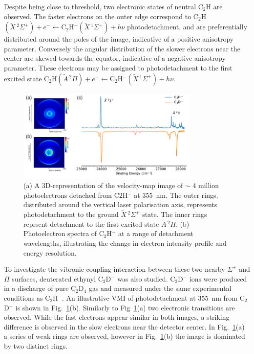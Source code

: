 \documentclass[journal=jpcafh,manuscript=article,layout=onecolumn, 12pt]{achemso}
\begin{document}
Despite being close to threshold, two electronic states of neutral C$_2$H are observed. The faster electrons on the outer edge correspond to C$_2$H$(\tilde{X}\,^2\Sigma^+)+e^- \leftarrow $C$_2$H$^-(\tilde{X}\,^1\Sigma^+)+h\nu$ photodetachment, and are preferentially distributed around the poles of the image, indicative of a positive anisotropy parameter. Conversely the angular distribution of the slower electrons near the center are skewed towards the equator, indicative of a negative anisotropy parameter. These electrons may be assigned to photodetachment to the first excited state C$_2$H$(\tilde{A}\,^2\Pi)+e^- \leftarrow $C$_2$H$^-(\tilde{X}\,^1\Sigma^+)+h\nu$.

\begin{figure}
	\includegraphics[width=0.8\textwidth]{figures/Fig1}
	\caption{(a) A 3D-representation of the velocity-map image of $\sim$ 4 million photoelectrons detached from C$2$H$^-$ at 355~nm. The outer rings, distributed around the vertical laser polarisation axis, represents photodetachment to the ground $\tilde{X}\,^2\Sigma^+$ state. The inner rings reprsent detachment to the first excited state $\tilde{A}\,^2\Pi$. (b) Photoelectron spectra of C$_2$H$^-$ at a range of detachment wavelengths, illustrating the change in electron intensity profile and energy resolution.}
	\label{fig:1}
\end{figure}

To investigate the vibronic coupling interaction between these two nearby $\Sigma^+$ and $\Pi$ surfaces, deuterated ethynyl C$_2$D$^-$ was also studied. C$_2$D$^-$ ions were produced in a discharge of pure C$_2$D$_4$ gas and measured under the same experimental conditions as C$_2$H$^-$. An illustrative VMI of photodetachment at 355~nm from C$_2$D$^-$ is shown in Fig.~\ref{fig:1}(b). Similarly to Fig~\ref{fig:1}(a) two electronic transitions are observed. While the fast electrons appear similar in both images, a striking difference is observed in the slow electrons near the detector center. In Fig.~\ref{fig:1}(a) a series of weak rings are observed, however in Fig.~\ref{fig:1}(b) the image is dominated by two distinct rings.
\end{document}
